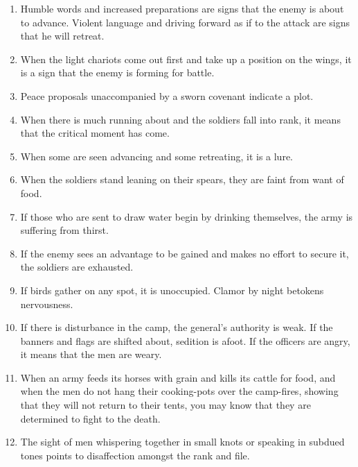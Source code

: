 \begin{enumerate}
  \item Humble words and increased preparations are signs that the
    enemy is about to advance. Violent language and driving forward as
    if to the attack are signs that he will retreat.

  \item When the light chariots come out first and take up a position
    on the wings, it is a sign that the enemy is forming for battle.

  \item Peace proposals unaccompanied by a sworn covenant indicate a
    plot.

  \item When there is much running about and the soldiers fall into
    rank, it means that the critical moment has come.

  \item When some are seen advancing and some retreating, it is a
    lure.

  \item When the soldiers stand leaning on their spears, they are
    faint from want of food.

  \item If those who are sent to draw water begin by drinking
    themselves, the army is suffering from thirst.

  \item If the enemy sees an advantage to be gained and makes no
    effort to secure it, the soldiers are exhausted.

  \item If birds gather on any spot, it is unoccupied. Clamor by night
    betokens nervousness.

  \item If there is disturbance in the camp, the general's authority
    is weak. If the banners and flags are shifted about, sedition is
    afoot. If the officers are angry, it means that the men are weary.

  \item When an army feeds its horses with grain and kills its cattle
    for food, and when the men do not hang their cooking-pots over the
    camp-fires, showing that they will not return to their tents, you
    may know that they are determined to fight to the death.

  \item The sight of men whispering together in small knots or
    speaking in subdued tones points to disaffection amongst the rank
    and file.


\end{enumerate}
